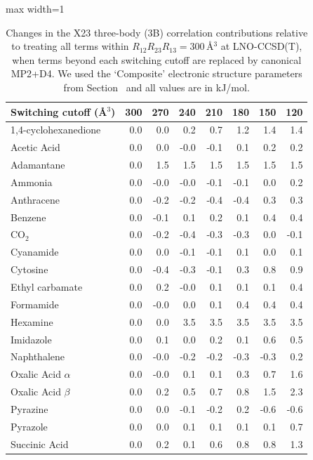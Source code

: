\begin{table}[h]
\centering
\caption{\label{tab:x23_3b_multilevel_mp2_d4}Changes in the X23 three-body (3B) correlation contributions relative to treating all terms within $R_{12}R_{23}R_{13}=300\,$\AA{}$^3$ at LNO-CCSD(T), when terms beyond each switching cutoff are replaced by canonical MP2+D4. We used the `Composite' electronic structure parameters from Section~ and all values are in kJ/mol.}
\begin{adjustbox}{max width=1\textwidth}
\begin{tabular}{lrrrrrrr}
\toprule
Switching cutoff (\AA{}$^3$) & 300 & 270 & 240 & 210 & 180 & 150 & 120 \\ 
\midrule
1,4-cyclohexanedione & 0.0 & 0.0 & 0.2 & 0.7 & 1.2 & 1.4 & 1.4 \\
Acetic Acid & 0.0 & 0.0 & -0.0 & -0.1 & 0.1 & 0.2 & 0.2 \\
Adamantane & 0.0 & 1.5 & 1.5 & 1.5 & 1.5 & 1.5 & 1.5 \\
Ammonia & 0.0 & -0.0 & -0.0 & -0.1 & -0.1 & 0.0 & 0.2 \\
Anthracene & 0.0 & -0.2 & -0.2 & -0.4 & -0.4 & 0.3 & 0.3 \\
Benzene & 0.0 & -0.1 & 0.1 & 0.2 & 0.1 & 0.4 & 0.4 \\
CO$_2$ & 0.0 & -0.2 & -0.4 & -0.3 & -0.3 & 0.0 & -0.1 \\
Cyanamide & 0.0 & 0.0 & -0.1 & -0.1 & 0.1 & 0.0 & 0.1 \\
Cytosine & 0.0 & -0.4 & -0.3 & -0.1 & 0.3 & 0.8 & 0.9 \\
Ethyl carbamate & 0.0 & 0.2 & -0.0 & 0.1 & 0.1 & 0.1 & 0.4 \\
Formamide & 0.0 & -0.0 & 0.0 & 0.1 & 0.4 & 0.4 & 0.4 \\
Hexamine & 0.0 & 0.0 & 3.5 & 3.5 & 3.5 & 3.5 & 3.5 \\
Imidazole & 0.0 & 0.1 & 0.0 & 0.2 & 0.1 & 0.6 & 0.5 \\
Naphthalene & 0.0 & -0.0 & -0.2 & -0.2 & -0.3 & -0.3 & 0.2 \\
Oxalic Acid $\alpha$ & 0.0 & -0.0 & 0.1 & 0.1 & 0.3 & 0.7 & 1.6 \\
Oxalic Acid $\beta$ & 0.0 & 0.2 & 0.5 & 0.7 & 0.8 & 1.5 & 2.3 \\
Pyrazine & 0.0 & 0.0 & -0.1 & -0.2 & 0.2 & -0.6 & -0.6 \\
Pyrazole & 0.0 & 0.0 & 0.1 & 0.1 & 0.1 & 0.1 & 0.7 \\
Succinic Acid & 0.0 & 0.2 & 0.1 & 0.6 & 0.8 & 0.8 & 1.3 \\

\end{tabular}
\end{adjustbox}
\end{table}
